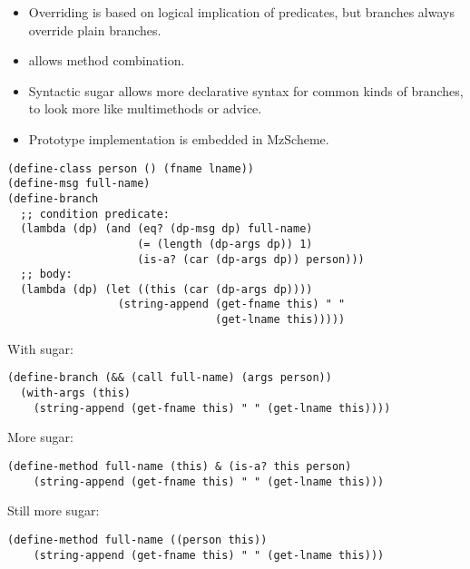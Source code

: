 \documentclass[landscape]{slides}
\begin{document}
\begin{slide}

  \begin{itemize}
    \item Overriding is based on logical implication of predicates,
          but  branches always override plain branches.
    \item {} allows method combination.
    \item Syntactic sugar allows more declarative syntax for common
          kinds of branches, to look more like multimethods or
          advice.
    \item Prototype implementation is embedded in MzScheme.
  \end{itemize}
\end{slide}

\begin{slide}

  \begin{verbatim}
(define-class person () (fname lname))
(define-msg full-name)
(define-branch
  ;; condition predicate:
  (lambda (dp) (and (eq? (dp-msg dp) full-name)
                    (= (length (dp-args dp)) 1)
                    (is-a? (car (dp-args dp)) person)))
  ;; body:
  (lambda (dp) (let ((this (car (dp-args dp))))
                 (string-append (get-fname this) " "
                                (get-lname this)))))\end{verbatim}
\end{slide}

\begin{slide}

With sugar:
\begin{verbatim}
(define-branch (&& (call full-name) (args person))
  (with-args (this)
    (string-append (get-fname this) " " (get-lname this))))
\end{verbatim}

More sugar:
\begin{verbatim}
(define-method full-name (this) & (is-a? this person)
    (string-append (get-fname this) " " (get-lname this)))
\end{verbatim}

Still more sugar:
\begin{verbatim}
(define-method full-name ((person this))
    (string-append (get-fname this) " " (get-lname this)))
\end{verbatim}
\end{slide}
\end{document}
